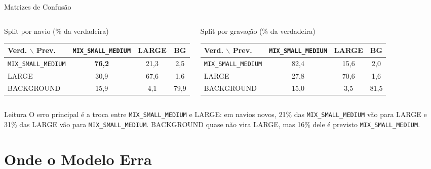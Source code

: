 \documentclass[aspectratio=169]{beamer}
\newcommand{\cahi}[1]{\cellcolor{green!30}\textbf{#1}}
\newcommand{\calo}[1]{\cellcolor{red!20}#1}
\newcommand{\mix}{\texttt{MIX\_SMALL\_MEDIUM}}
\begin{document}
\begin{frame}{Matrizes de Confusão}
    \footnotesize
    \begin{columns}[t]
        \begin{block}{\small Split por navio (\% da verdadeira)}
            \tiny
            \centering
            \setlength{\tabcolsep}{3pt}
            \begin{tabular}{lccc}
            \toprule
            Verd. $\backslash$ Prev. & \mix & LARGE & BG \\
            \midrule
            \mix & \cahi{76,2} & 21,3 & 2,5 \\
            LARGE & \calo{30,9} & 67,6 & 1,6 \\
            BACKGROUND & 15,9 & 4,1 & 79,9 \\
            \bottomrule
            \end{tabular}
        \end{block}
        \begin{block}{\small Split por gravação (\% da verdadeira)}
            \tiny
            \centering
            \setlength{\tabcolsep}{3pt}
            \begin{tabular}{lccc}
            \toprule
            Verd. $\backslash$ Prev. & \mix & LARGE & BG \\
            \midrule
            \mix & 82,4 & 15,6 & 2,0 \\
            LARGE & 27,8 & 70,6 & 1,6 \\
            BACKGROUND & 15,0 & 3,5 & 81,5 \\
            \bottomrule
            \end{tabular}
        \end{block}
    \end{columns}
    \vspace{0.15cm}
    \begin{alertblock}{Leitura}
        \scriptsize
        O erro principal é a troca entre \mix{} e LARGE: em navios novos, 21\% das \mix{} vão para LARGE e 31\% das LARGE vão para \mix. BACKGROUND quase não vira LARGE, mas 16\% dele é previsto \mix.
    \end{alertblock}
\end{frame}

\section{Onde o Modelo Erra}
\end{document}
